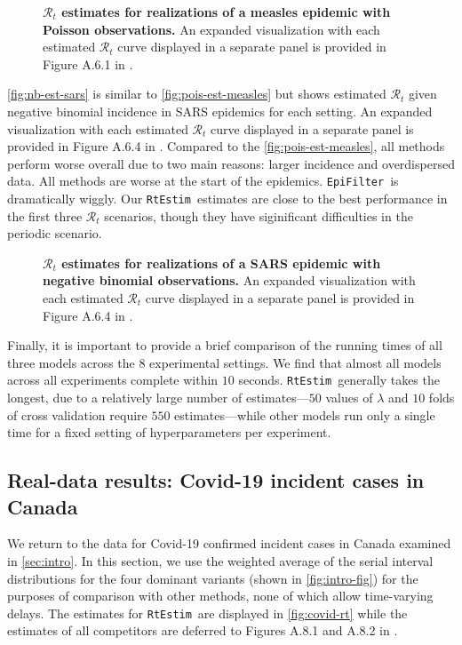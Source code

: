 \documentclass[10pt,letterpaper]{article}
\def\RtEstim{\texttt{RtEstim}}
\def\EpiFilter{\texttt{EpiFilter}}
\def\calR{\mathcal{R}}
\begin{document}
\begin{figure}[!t]
  \centering
  \caption{{\bf $\calR_t$ estimates for realizations of a measles epidemic with
    Poisson observations.} An expanded visualization with each estimated
    $\calR_t$ curve displayed in a separate panel is provided in Figure A.6.1 in
    .}
  \label{fig:pois-est-measles}
\end{figure}

\autoref{fig:nb-est-sars} is similar to \autoref{fig:pois-est-measles} but
shows estimated $\calR_t$ given negative binomial incidence in SARS epidemics
for each setting. An expanded visualization with each estimated $\calR_t$ curve
displayed in a separate panel is provided in Figure A.6.4 in .
Compared to the \autoref{fig:pois-est-measles}, all methods perform worse
overall due to two main reasons: larger incidence and overdispersed data. All
methods are worse at the start of the epidemics. \EpiFilter\ is dramatically
wiggly. Our \RtEstim\ estimates are close to the best
performance in the first three $\calR_t$ scenarios, though they have
siginificant difficulties in the periodic scenario. 

\begin{figure}[!t]
  \centering
  \caption{
    {\bf $\calR_t$ estimates for realizations of a SARS epidemic with
    negative binomial observations.} An expanded visualization with each estimated
    $\calR_t$ curve displayed in a separate panel is provided in Figure A.6.4 in
    .}
  \label{fig:nb-est-sars}
\end{figure}

Finally, it is important to provide a brief comparison of the running times of
all three models across the $8$ experimental settings. We find that almost all
models across all experiments complete within $10$ seconds. \RtEstim\ generally
takes the longest, due to a relatively large number of estimates---$50$ values
of $\lambda$ and $10$ folds of cross validation require $550$ estimates---while
other models run only a single time for a fixed setting of hyperparameters per
experiment. 


\subsection{Real-data results: Covid-19 incident cases in Canada}

We return to the data for Covid-19 confirmed incident cases in Canada examined
in \autoref{sec:intro}. In this section, we use the weighted average of the
serial interval distributions for the four dominant variants (shown in
\autoref{fig:intro-fig}) for the purposes of comparison with other methods, none
of which allow time-varying delays. The estimates for \RtEstim\ are displayed in
\autoref{fig:covid-rt} while the estimates of all competitors are deferred to
Figures A.8.1 and A.8.2 in . 
\end{document}

